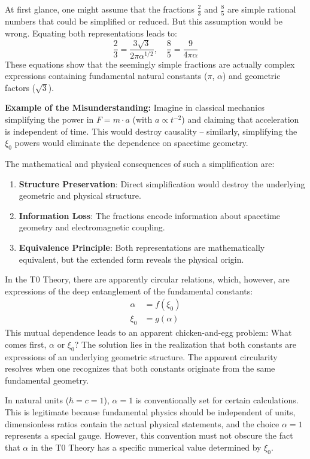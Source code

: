 \documentclass[12pt,a4paper]{article}
\newcommand{\xipar}{\xi_0}
\begin{document}
	At first glance, one might assume that the fractions $\frac{2}{3}$ and $\frac{8}{5}$ are simple rational numbers that could be simplified or reduced. But this assumption would be wrong. Equating both representations leads to:
	\[
	\frac{2}{3} = \frac{3\sqrt{3}}{2\pi\alpha^{1/2}}, \quad \frac{8}{5} = \frac{9}{4\pi\alpha}
	\]
	These equations show that the seemingly simple fractions are actually complex expressions containing fundamental natural constants ($\pi$, $\alpha$) and geometric factors ($\sqrt{3}$).
	
	\textbf{Example of the Misunderstanding:} Imagine in classical mechanics simplifying the power in $F = m \cdot a$ (with $a \propto t^{-2}$) and claiming that acceleration is independent of time. This would destroy causality – similarly, simplifying the $\xipar$ powers would eliminate the dependence on spacetime geometry.
	
	The mathematical and physical consequences of such a simplification are:
	\begin{enumerate}
		\item \textbf{Structure Preservation}: Direct simplification would destroy the underlying geometric and physical structure.
		\item \textbf{Information Loss}: The fractions encode information about spacetime geometry and electromagnetic coupling.
		\item \textbf{Equivalence Principle}: Both representations are mathematically equivalent, but the extended form reveals the physical origin.
	\end{enumerate}
	
	In the T0 Theory, there are apparently circular relations, which, however, are expressions of the deep entanglement of the fundamental constants:
	\begin{align*}
		\alpha &= f(\xipar) \\
		\xipar &= g(\alpha)
	\end{align*}
	This mutual dependence leads to an apparent chicken-and-egg problem: What comes first, $\alpha$ or $\xipar$? The solution lies in the realization that both constants are expressions of an underlying geometric structure. The apparent circularity resolves when one recognizes that both constants originate from the same fundamental geometry.
	
	In natural units ($\hbar = c = 1$), $\alpha = 1$ is conventionally set for certain calculations. This is legitimate because fundamental physics should be independent of units, dimensionless ratios contain the actual physical statements, and the choice $\alpha = 1$ represents a special gauge. However, this convention must not obscure the fact that $\alpha$ in the T0 Theory has a specific numerical value determined by $\xipar$.
	
\end{document}
